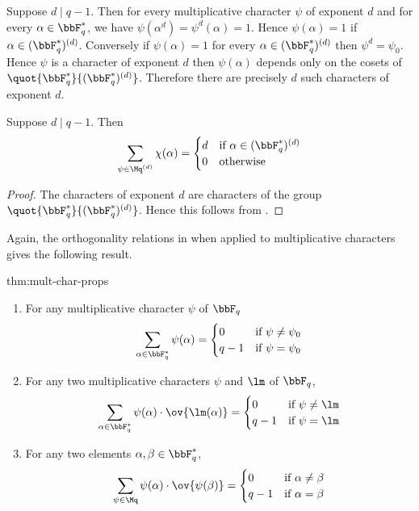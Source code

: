 Suppose $d\mid q-1$. Then for every multiplicative character $\psi$ of exponent $d$ and for every $\alpha\in \bbF_q^*$, we have $\psi(\alpha^d)=\psi^d(\alpha)=1$. Hence $\psi(\alpha)=1$ if $\alpha\in (\bbF_q^*)^{(d)}$. Conversely if $\psi(\alpha)=1$ for every $\alpha\in (\bbF_q^*)^{(d)}$ then $\psi^d=\psi_0$. Hence $\psi$ is a character of exponent $d$ then $\psi(\alpha)$ depends only on the cosets of $\quot{\bbF_q^*}{(\bbF_q^*)^{(d)}}$. Therefore there are precisely $d$ such characters of exponent $d$.

\begin{Theorem}{}{}
  Suppose $d\mid q-1$. Then $$\sum_{\psi\in\Mq^{(d)}}\chi(\alpha)=\begin{cases}
      d & \text{if }\alpha\in (\bbF_q^*)^{(d)} \\
      0 & \text{otherwise}
    \end{cases}$$
\end{Theorem}
\begin{proof}
  The characters of exponent $d$ are characters of the group $\quot{\bbF_q^*}{(\bbF_q^*)^{(d)}}$. Hence this follows from .
\end{proof}

Again, the orthogonality relations in  when applied to multiplicative characters gives the following result.
\begin{Theorem}{}{thm:mult-char-props}
  \begin{enumerate}[label=(\roman*)]
    \item For any multiplicative character $\psi$ of $\bbF_q$ $$\sum_{\alpha\in\bbF^*_q}\psi(\alpha)=\begin{cases}
              0   & \text{if $\psi\neq \psi_0$} \\
              q-1 & \text{if $\psi= \psi_0$}
            \end{cases}$$
    \item For any two multiplicative characters $\psi$ and $\lm$ of $\bbF_q$, $$\sum_{\alpha\in\bbF^*_q}\psi(\alpha)\cdot \ov{\lm(\alpha)}=\begin{cases}
              0   & \text{if $\psi\neq \lm$} \\
              q-1 & \text{if $\psi= \lm$}
            \end{cases}$$
    \item For any two elements $\alpha,\beta\in\bbF^*_q$, $$\sum_{\psi\in \Mq}\psi(\alpha)\cdot\ov{\psi(\beta)}=\begin{cases}
              0   & \text{if $\alpha\neq \beta$} \\
              q-1 & \text{if $\alpha=\beta$}
            \end{cases}$$
  \end{enumerate}
\end{Theorem}


